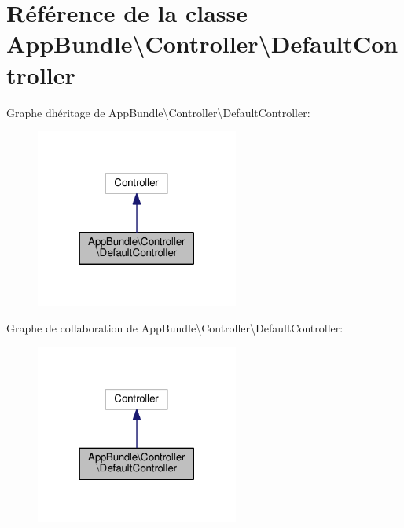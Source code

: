 \hypertarget{classAppBundle_1_1Controller_1_1DefaultController}{}\section{Référence de la classe App\+Bundle\textbackslash{}Controller\textbackslash{}Default\+Controller}
\label{classAppBundle_1_1Controller_1_1DefaultController}


Graphe d\textquotesingle{}héritage de App\+Bundle\textbackslash{}Controller\textbackslash{}Default\+Controller\+:\nopagebreak
\begin{figure}[H]
\begin{center}
\leavevmode
\includegraphics[width=189pt]{classAppBundle_1_1Controller_1_1DefaultController__inherit__graph}
\end{center}
\end{figure}


Graphe de collaboration de App\+Bundle\textbackslash{}Controller\textbackslash{}Default\+Controller\+:\nopagebreak
\begin{figure}[H]
\begin{center}
\leavevmode
\includegraphics[width=189pt]{classAppBundle_1_1Controller_1_1DefaultController__coll__graph}
\end{center}
\end{figure}
